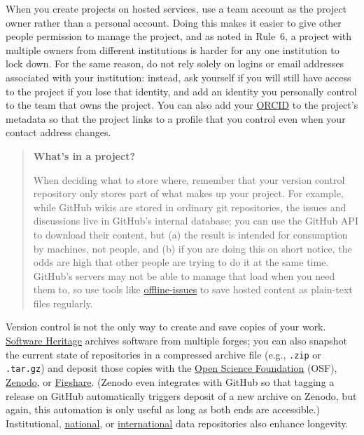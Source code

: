 \documentclass[10pt,letterpaper]{article}
\begin{document}
When you create projects on hosted services,
use a team account as the project owner rather than a personal account.
Doing this makes it easier to give other people permission to manage the project,
and as noted in Rule~6,
a project with multiple owners from different institutions
is harder for any one institution to lock down.
For the same reason,
do not rely solely on logins or email addresses associated with your institution:
instead,
ask yourself if you will still have access to the project if you lose that identity,
and add an identity you personally control to the team that owns the project.
You can also add your \href{https://orcid.org/}{ORCID} to the project's metadata
so that the project links to a profile that you control
even when your contact address changes.

\begin{quote}
  \noindent
  \textbf{What's in a project?}

  When deciding what to store where,
  remember that your version control repository only stores part of what makes up your project.
  For example,
  while GitHub wikis are stored in ordinary git repositories, the issues and discussions live in GitHub's internal database;
  you can use the GitHub API to download their content,
  but (a) the result is intended for consumption by machines, not people,
  and (b) if you are doing this on short notice,
  the odds are high that other people are trying to do it at the same time.
  GitHub's servers may not be able to manage that load when you need them to,
  so use tools like \href{https://github.com/jlord/offline-issues}{offline-issues}
  to save hosted content as plain-text files regularly.
\end{quote}

Version control is not the only way to create and save copies of your work.
\href{https://www.softwareheritage.org/how-to-archive-reference-code/}{Software Heritage} archives software from multiple forges;
you can also snapshot the current state of repositories in a compressed archive file
(e.g., \texttt{.zip} or \texttt{.tar.gz})
and deposit those copies with the \href{https://osf.io/}{Open Science Foundation} (OSF),
\href{https://zenodo.org/}{Zenodo},
or \href{https://figshare.com/}{Figshare}.
(Zenodo even integrates with GitHub so that tagging a release on GitHub
automatically triggers deposit of a new archive on Zenodo,
but again,
this automation is only useful as long as both ends are accessible.)
Institutional,
\href{https://amt.coretrustseal.org/certificates/}{national},
or \href{https://safeguar.de/}{international} data repositories also enhance longevity.
\end{document}
